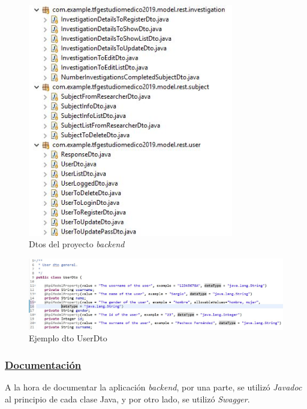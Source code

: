 \begin{itemize}
\begin{itemize}
                    \begin{figure}[h]
                        \centering
                        \includegraphics[width=0.8\textwidth]{images/dto.JPG}
                        \caption{Dtos del proyecto \textit{backend}}
                    \end{figure}
            
                    \begin{figure}[h]
                        \centering
                        \includegraphics[width=1\textwidth]{images/userdto.JPG}
                        \caption{Ejemplo dto UserDto}
                    \end{figure}
            
            \FloatBarrier
                
                
            \end{itemize}
            
            
        \end{itemize}
        \subsubsection{\underline{Documentación}}
        A la hora de documentar la aplicación \textit{backend}, por una parte, se utilizó \textit{Javadoc} al principio de cada clase Java, y por otro lado, se utilizó \textit{Swagger}. 
        \newline
        
